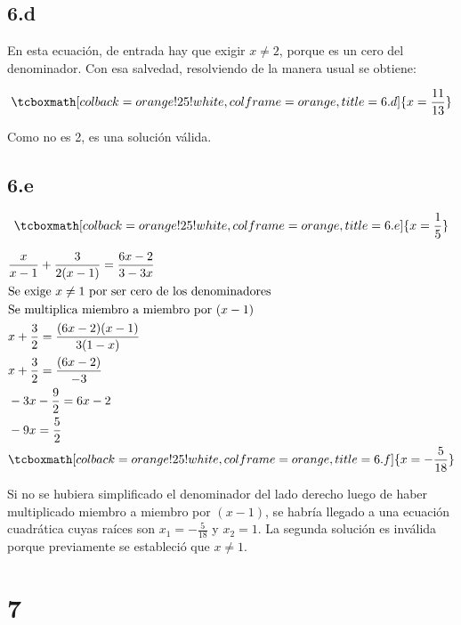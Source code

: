 \documentclass{article}
\newcommand{\hresult}[2]{\tcboxmath[colback=orange!25!white,colframe=orange, title=#1] {#2} }
\begin{document}
\subsection*{6.d}
\label{subsec:6.d}

En esta ecuación, de entrada hay que exigir $x \neq 2$, porque es un cero del denominador. Con esa salvedad, resolviendo de la manera usual se obtiene:

\begin{equation}
\hresult{6.d} { x = \frac{11}{13} }
\end{equation}

Como no es 2, es una solución válida.

\subsection*{6.e}
\label{subsec:6.e}

\begin{equation}
\hresult{6.e} { x = \frac{1}{5} }
\end{equation}

\begin{subequations}
\begin{align}
& \frac{x}{x-1} + \frac{3}{2(x-1)} = \frac{6x-2}{3-3x} \\
& \text{Se exige } x \neq 1 \text{ por ser cero de los denominadores} \\
& \text{Se multiplica miembro a miembro por } (x-1) \\
& x + \frac{3}{2} = \frac{(6x-2) (x-1)}{3 (1-x)} \\
& x + \frac{3}{2} = \frac{(6x-2)}{-3} \\
& -3x - \frac{9}{2} = 6x - 2 \\
& -9x = \frac{5}{2} \\
& \hresult{6.f} { x = -\frac{5}{18} }
\end{align}
\end{subequations}

Si no se hubiera simplificado el denominador del lado derecho luego de haber multiplicado miembro a miembro por $(x-1)$, se habría llegado a una ecuación cuadrática cuyas raíces son $x_1 = -\frac{5}{18}$ y $x_2 = 1$. La segunda solución es inválida porque previamente se estableció que $x \neq 1$.

\section*{7}
\label{sec:7}
\end{document}
